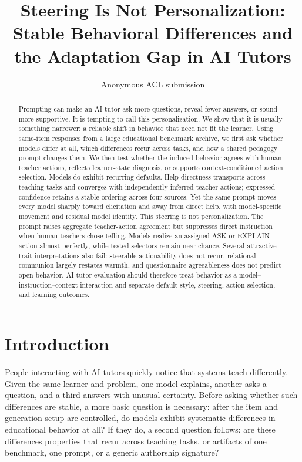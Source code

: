 \documentclass[11pt]{article}
\title{Steering Is Not Personalization:\\
Stable Behavioral Differences and the Adaptation Gap in AI Tutors}
\author{Anonymous ACL submission}
\begin{document}
\maketitle

\begin{abstract}
Prompting can make an AI tutor ask more questions, reveal fewer answers, or sound
more supportive. It is tempting to call this personalization. We show that it is
usually something narrower: a reliable shift in behavior that need not fit the
learner. Using same-item responses from a large educational benchmark archive,
we first ask whether models differ at all, which differences recur across tasks,
and how a shared pedagogy prompt changes them. We then test whether the induced
behavior agrees with human teacher actions, reflects learner-state diagnosis, or
supports context-conditioned action selection. Models do exhibit recurring
defaults. Help directness transports across teaching tasks and converges with
independently inferred teacher actions; expressed confidence retains a stable
ordering across four sources. Yet the same prompt moves every model sharply
toward elicitation and away from direct help, with model-specific movement and
residual model identity. This steering is not personalization. The prompt raises
aggregate teacher-action agreement but suppresses direct instruction when human
teachers chose telling. Models realize an assigned ASK or EXPLAIN action almost
perfectly, while tested selectors remain near chance. Several attractive trait
interpretations also fail: steerable actionability does not recur, relational
communion largely restates warmth, and questionnaire agreeableness does not
predict open behavior. AI-tutor evaluation should therefore treat behavior as a
model--instruction--context interaction and separate default style, steering,
action selection, and learning outcomes.
\end{abstract}

\section{Introduction}

People interacting with AI tutors quickly notice that systems teach differently.
Given the same learner and problem, one model explains, another asks a question,
and a third answers with unusual certainty. Before asking whether such
differences are stable, a more basic question is necessary: after the item and
generation setup are controlled, do models exhibit systematic differences in
educational behavior at all? If they do, a second question follows: are these
differences properties that recur across teaching tasks, or artifacts of one
benchmark, one prompt, or a generic authorship signature?
\end{document}

